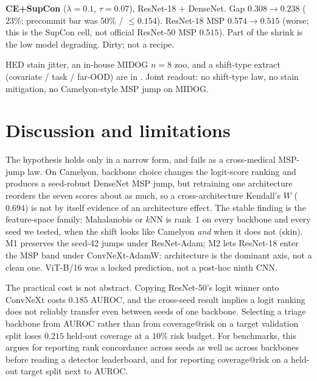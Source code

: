 \documentclass[anon]{midl}
\begin{document}
\textbf{CE{+}SupCon} ($\lambda{=}0.1$, $\tau{=}0.07$), ResNet-18 ${+}$ DenseNet.
Gap $0.308{\to}0.238$ ($23\%$; precommit bar was $50\%$ / ${\le}0.154$).
ResNet-18 MSP $0.574{\to}\mathbf{0.515}$ (worse; this is the SupCon cell, not official ResNet-50 MSP $0.515$).
Part of the shrink is the low model degrading.
Dirty; not a recipe.

HED stain jitter, an in-house MIDOG $n{=}8$ zoo, and a shift-type extract (covariate / task / far-OOD) are in .
Joint readout: no shift-type law, no stain mitigation, no Camelyon-style MSP jump on MIDOG.

\section{Discussion and limitations}

The hypothesis holds only in a narrow form, and fails as a cross-medical MSP-jump law.
On Camelyon, backbone choice changes the logit-score ranking and produces a seed-robust DenseNet MSP jump, but retraining one architecture reorders the seven scores about as much, so a cross-architecture Kendall's $W$ ($0.694$) is not by itself evidence of an architecture effect.
The stable finding is the feature-space family: Mahalanobis or $k$NN is rank~1 on every backbone and every seed we tested, when the shift looks like Camelyon \emph{and} when it does not (skin).
M1 preserves the seed-42 jumps under ResNet-Adam; M2 lets ResNet-18 enter the MSP band under ConvNeXt-AdamW: architecture is the dominant axis, not a clean one.
ViT-B/16 was a locked prediction, not a post-hoc ninth CNN.

The practical cost is not abstract.
Copying ResNet-50's logit winner onto ConvNeXt costs $0.185$ AUROC, and the cross-seed result implies a logit ranking does not reliably transfer even between seeds of one backbone.
Selecting a triage backbone from AUROC rather than from coverage@risk on a target validation split loses $0.215$ held-out coverage at a $10\%$ risk budget.
For benchmarks, this argues for reporting rank concordance across seeds as well as across backbones before reading a detector leaderboard, and for reporting coverage@risk on a held-out target split next to AUROC.
\end{document}
